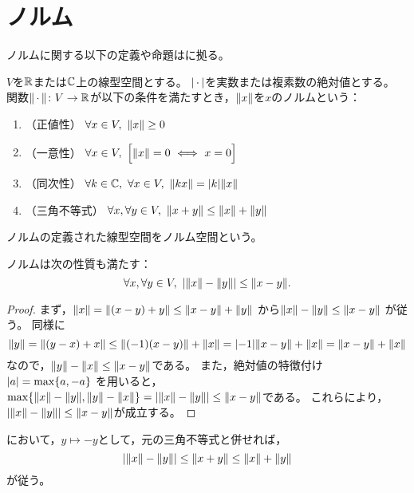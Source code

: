 \documentclass[b5paper,draft,oneside,openany]{ltjsbook} %
\begin{document}
\ifdraft{\tableofcontents}{}
\section{ノルム}
ノルムに関する以下の定義や命題は\cite{nomura}に拠る。

\begin{defi}[ノルム]
    $V$を$\mathbb{R}$または$\mathbb{C}$上の線型空間とする。
    $\abs{\dummy}$を実数または複素数の絶対値とする。
    関数$\norm{\dummy}\colon V\to \R$が以下の条件を満たすとき，$\norm{x}$を$x$のノルムという：
    \begin{enumerate}[label=(\roman*)]
        \item （正値性） $\forall x\in V,\ \norm{x}\geq 0$
        \item （一意性） $\forall x\in V,\ \bsqu{\norm{x}=0\ \Longleftrightarrow\ x=0}$
        \item （同次性） $\forall k\in \CC,\ \forall x\in V,\ \norm{kx}=\abs{k}\norm{x}$
        \item （三角不等式） $\forall x, \forall y\in V,\ \norm{x+y}\leq \norm{x}+\norm{y}$
    \end{enumerate}
    ノルムの定義された線型空間をノルム空間という。
\end{defi}


\begin{prop}[三角不等式]
    ノルムは次の性質も満たす：
    \begin{equation}
        \forall x, \forall y\in V,\ \abs{\norm{x}-\norm{y}}\leq \norm{x-y}.
    \end{equation}
    \begin{proof}
        まず，$\norm{x}=\norm{\pare{x-y}+y}\leq \norm{x-y}+\norm{y}$
        から$\norm{x}-\norm{y}\leq \norm{x-y}$
        が従う。
        同様に
        \begin{equation}
            \norm{y}=\norm{\pare{y-x}+x}\leq \norm{\pare{-1}\pare{x-y}}+\norm{x}=\abs{-1}\norm{x-y}+\norm{x}=\norm{x-y}+\norm{x}
        \end{equation}
        なので，$\norm{y}-\norm{x}\leq \norm{x-y}$である。
        また，絶対値の特徴付け$\abs{a}= \max\bra{a,-a}$
        を用いると，$ \max\bra{\norm{x}-\norm{y},\norm{y}-\norm{x}} = \abs{\norm{x}-\norm{y}}\leq \norm{x-y}$である。
        これらにより，$\abs{\norm{x}-\norm{y}}\leq \norm{x-y}$が成立する。
    \end{proof}
\end{prop}

\begin{cor}
    において，$y\mapsto -y$として，元の三角不等式と併せれば，
    \begin{equation}
        \abs{\norm{x}-\norm{y}}\leq \norm{x+y}\leq \norm{x}+\norm{y}
    \end{equation}
    が従う。
\end{cor}
\end{document}

